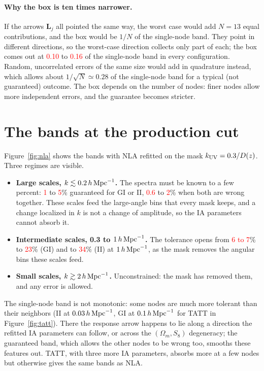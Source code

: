 \documentclass[11pt]{article}
\newcommand{\hMpc}{\,h\,{\rm Mpc}^{-1}}
\newcommand{\kuv}{k_{\rm UV}}
\newcommand{\bvec}[1]{\boldsymbol{#1}}
\newif\ifnumbersfinal
\newcommand{\refresh}[1]{\ifnumbersfinal#1\else\textcolor{red}{#1}\fi}
\newcommand{\JointLowLo}{\refresh{1}}
\newcommand{\JointLowHi}{\refresh{5}}
\newcommand{\JointBothLo}{\refresh{0.6}}   %
\newcommand{\JointBothHi}{\refresh{2}}
\newcommand{\JointMidGI}{\refresh{6 to 7}} %
\newcommand{\JointOneGI}{\refresh{23}}     %
\newcommand{\JointOneII}{\refresh{34}}     %
\newcommand{\RatioLo}{\refresh{0.10}}
\newcommand{\RatioHi}{\refresh{0.16}}
\newcommand{\Nnodes}{13}
\begin{document}
\paragraph{Why the box is ten times narrower.}
If the arrows $\bvec L_j$ all pointed the same way, the worst case would
add $N = \Nnodes$ equal contributions, and the box would be $1/N$ of the
single-node band. They point in different directions, so the
worst-case direction collects only part of each; the box comes out at
\RatioLo{} to \RatioHi{} of the single-node band in every configuration.
Random, uncorrelated errors of the same size would add in quadrature
instead, which allows about $1/\sqrt N \simeq 0.28$ of the single-node
band for a typical (not guaranteed) outcome. The box depends on the
number of nodes: finer nodes allow more independent errors, and the
guarantee becomes stricter.

\section{The bands at the production cut}
\label{sec:results}

Figure~\ref{fig:nla} shows the bands with NLA refitted on the mask $\kuv =
0.3/D(z)$. Three regimes are visible.
\begin{itemize}
  \item \textbf{Large scales, $k \lesssim 0.2\hMpc$.} The spectra must be
    known to a few percent: \JointLowLo{} to \JointLowHi\% guaranteed for GI
    or II, \JointBothLo{} to \JointBothHi\% when both are wrong together.
    These scales feed the large-angle bins that every mask keeps, and a
    change localized in $k$ is not a change of amplitude, so the IA
    parameters cannot absorb it.
  \item \textbf{Intermediate scales, 0.3 to $1\hMpc$.} The tolerance opens
    from \JointMidGI\% to \JointOneGI\% (GI) and to \JointOneII\% (II) at
    $1\hMpc$, as the mask removes the angular bins these scales feed.
  \item \textbf{Small scales, $k \gtrsim 2\hMpc$.} Unconstrained: the mask
    has removed them, and any error is allowed.
\end{itemize}
The single-node band is not monotonic: some nodes are much more tolerant
than their neighbors (II at $0.03\hMpc$, GI at $0.1\hMpc$ for TATT in
Figure~\ref{fig:tatt}). There the response arrow happens to lie along a
direction the refitted IA parameters can follow, or across the $(\Omega_m,
S_8)$ degeneracy; the guaranteed band, which allows the other nodes to be
wrong too, smooths these features out. TATT, with three more IA parameters,
absorbs more at a few nodes but otherwise gives the same bands as NLA.
\end{document}
